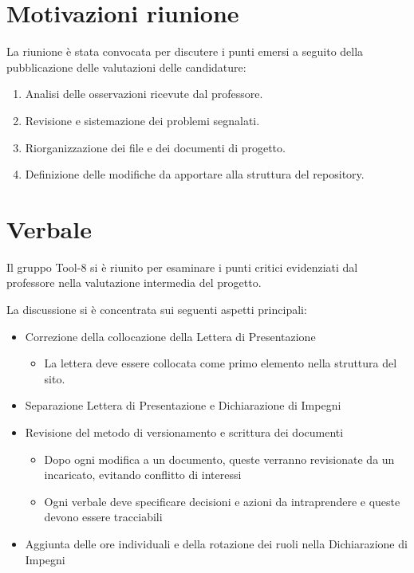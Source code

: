 \documentclass[a4paper,10pt]{article}
\begin{document}
\section*{Motivazioni riunione}
La riunione è stata convocata per discutere i punti emersi a seguito della pubblicazione delle valutazioni delle candidature:

\begin{enumerate}
    \item Analisi delle osservazioni ricevute dal professore.
    \item Revisione e sistemazione dei problemi segnalati.
    \item Riorganizzazione dei file e dei documenti di progetto.
    \item Definizione delle modifiche da apportare alla struttura del repository.
\end{enumerate}

\newpage

\section*{Verbale}

Il gruppo Tool-8 si è riunito per esaminare i punti critici evidenziati dal professore nella valutazione intermedia del progetto.  

La discussione si è concentrata sui seguenti aspetti principali:

\begin{itemize}
    \item Correzione della collocazione della Lettera di Presentazione
    \begin{itemize}
        \item La lettera deve essere collocata come primo elemento nella struttura del sito.
    \end{itemize}
    \item Separazione Lettera di Presentazione e Dichiarazione di Impegni
    \item Revisione del metodo di versionamento e scrittura dei documenti 
    \begin{itemize}
        \item Dopo ogni modifica a un documento, queste verranno revisionate da un incaricato, evitando conflitto di interessi
        \item Ogni verbale deve specificare decisioni e azioni da intraprendere e queste devono essere tracciabili
    \end{itemize}
    \item Aggiunta delle ore individuali e della rotazione dei ruoli nella Dichiarazione di Impegni
\end{itemize}
\end{document}
